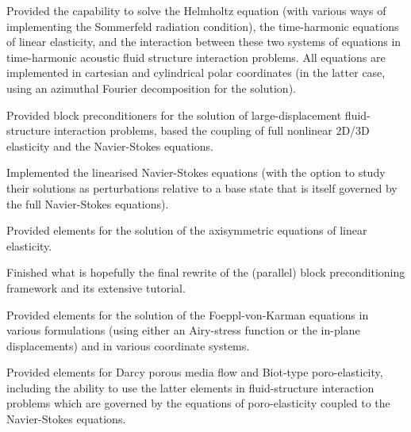 \begin{DoxyItemize}
\item Provided the capability to solve the Helmholtz equation (with various ways of implementing the Sommerfeld radiation condition), the time-\/harmonic equations of linear elasticity, and the interaction between these two systems of equations in time-\/harmonic acoustic fluid structure interaction problems. All equations are implemented in cartesian and cylindrical polar coordinates (in the latter case, using an azimuthal Fourier decomposition for the solution). ~\newline
~\newline

\item Provided block preconditioners for the solution of large-\/displacement fluid-\/structure interaction problems, based the coupling of full nonlinear 2\+D/3D elasticity and the Navier-\/\+Stokes equations. ~\newline
~\newline

\item Implemented the linearised Navier-\/\+Stokes equations (with the option to study their solutions as perturbations relative to a base state that is itself governed by the full Navier-\/\+Stokes equations). ~\newline
~\newline

\item Provided elements for the solution of the axisymmetric equations of linear elasticity. ~\newline
~\newline

\item Finished what is hopefully the final rewrite of the (parallel) block preconditioning framework and its extensive tutorial. ~\newline
~\newline

\item Provided elements for the solution of the Foeppl-\/von-\/\+Karman equations in various formulations (using either an Airy-\/stress function or the in-\/plane displacements) and in various coordinate systems. ~\newline
~\newline

\item Provided elements for Darcy porous media flow and Biot-\/type poro-\/elasticity, including the ability to use the latter elements in fluid-\/structure interaction problems which are governed by the equations of poro-\/elasticity coupled to the Navier-\/\+Stokes equations. ~\newline
~\newline


\end{DoxyItemize}
